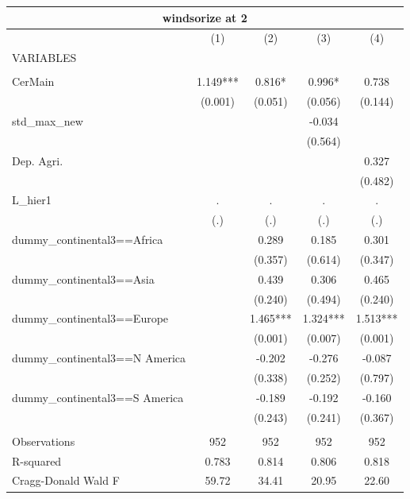 \documentclass[12pt,a4paper]{article}
\begin{document}
\begin{tabular}{lcccc}
\multicolumn{5}{c}{windsorize at 2} \\ \hline
 & (1) & (2) & (3) & (4) \\
VARIABLES &  &  &  &  \\ \hline
 &  &  &  &  \\
CerMain & 1.149*** & 0.816* & 0.996* & 0.738 \\
 & (0.001) & (0.051) & (0.056) & (0.144) \\
std\_max\_new &  &  & -0.034 &  \\
 &  &  & (0.564) &  \\
Dep. Agri. &  &  &  & 0.327 \\
 &  &  &  & (0.482) \\
L\_hier1 & . & . & . & . \\
 & (.) & (.) & (.) & (.) \\
dummy\_continental3==Africa &  & 0.289 & 0.185 & 0.301 \\
 &  & (0.357) & (0.614) & (0.347) \\
dummy\_continental3==Asia &  & 0.439 & 0.306 & 0.465 \\
 &  & (0.240) & (0.494) & (0.240) \\
dummy\_continental3==Europe &  & 1.465*** & 1.324*** & 1.513*** \\
 &  & (0.001) & (0.007) & (0.001) \\
dummy\_continental3==N America &  & -0.202 & -0.276 & -0.087 \\
 &  & (0.338) & (0.252) & (0.797) \\
dummy\_continental3==S America &  & -0.189 & -0.192 & -0.160 \\
 &  & (0.243) & (0.241) & (0.367) \\
 &  &  &  &  \\
Observations & 952 & 952 & 952 & 952 \\
R-squared & 0.783 & 0.814 & 0.806 & 0.818 \\
 Cragg-Donald Wald F & 59.72 & 34.41 & 20.95 & 22.60 \\ \hline
\end{tabular}
\end{document}
